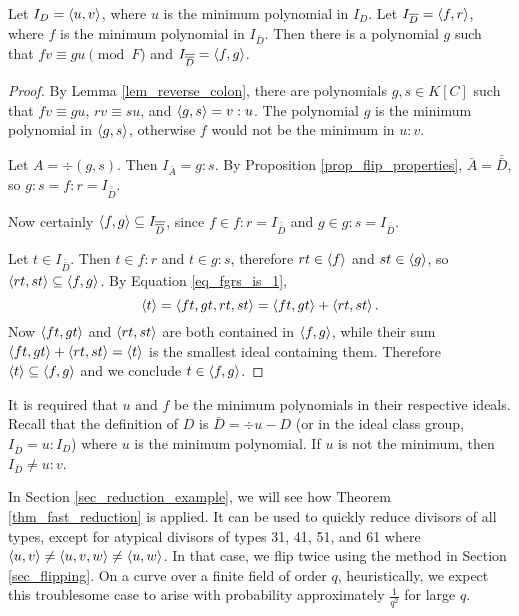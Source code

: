 \begin{theorem}
  \label{thm_fast_reduction}
  Let $I_D = \left\langle u,v \right\rangle$, where $u$ is the minimum polynomial in $I_D$.
  Let $I_{\overline D} = \left\langle f, r \right\rangle$, where $f$ is the minimum polynomial in $I_{\bar D}$.
  Then there is a polynomial $g$ such that $fv \equiv gu \pmod F$ and $I_{\overline{\overline D}} = \left\langle f,g \right\rangle$.
\end{theorem}
\begin{proof}
  By Lemma \ref{lem_reverse_colon},
  there are polynomials $g, s \in K[C]$ such that $fv \equiv gu$, $rv \equiv su$, and $\left\langle g,s \right\rangle = v : u$.
  The polynomial $g$ is the minimum polynomial in $\left\langle g,s \right\rangle$,
  otherwise $f$ would not be the minimum in $u : v$.
  
  Let $A = \div(g,s)$.
  Then $I_{\bar A} = g : s$.
  By Proposition \ref{prop_flip_properties}, $\bar A = \bar{\bar D}$,
  so $g : s = f : r = I_{\bar{\bar D}}$.
  
  Now certainly $\left\langle f,g \right\rangle \subseteq I_{\overline{\overline D}}$,
  since $f \in f : r = I_{\bar{\bar D}}$ and $g \in g : s = I_{\bar{\bar D}}$.
  
  Let $t \in I_{\bar{\bar D}}$.
  Then $t \in f : r$ and $t \in g : s$, therefore $rt \in \left\langle f \right\rangle$ and $st \in \left\langle g \right\rangle$,
  so $\left\langle rt, st \right\rangle \subseteq \left\langle f,g \right\rangle$.
  By Equation \ref{eq_fgrs_is_1},
  \[ \left\langle t \right\rangle = \left\langle ft,gt,rt,st \right\rangle = \left\langle ft,gt \right\rangle + \left\langle rt,st \right\rangle. \]
  Now $\left\langle ft,gt \right\rangle$ and $\left\langle rt,st \right\rangle$ are both contained in $\left\langle f, g \right\rangle$,
  while their sum $\left\langle ft,gt \right\rangle + \left\langle rt,st \right\rangle = \left\langle t \right\rangle$ is the smallest ideal containing them.
  Therefore $\left\langle t \right\rangle \subseteq \left\langle f,g \right\rangle$ and we conclude $t \in \left\langle f,g \right\rangle$.
\end{proof}
\begin{remark}
  It is required that $u$ and $f$ be the minimum polynomials in their respective ideals.
  Recall that the definition of $D$ is $\bar D = \div u - D$
  (or in the ideal class group, $I_{\bar D} = u : I_D$)
  where $u$ is the minimum polynomial.
  If $u$ is not the minimum, then $I_{\bar D} \neq u : v$.
\end{remark}

In Section \ref{sec_reduction_example}, we will see how Theorem \ref{thm_fast_reduction} is applied.
It can be used to quickly reduce divisors of all types, except for atypical divisors of types 31, 41, 51, and 61
where $\left\langle u,v \right\rangle \neq \left\langle u,v,w \right\rangle \neq \left\langle u,w \right\rangle$.
In that case, we flip twice using the method in Section \ref{sec_flipping}.
On a curve over a finite field of order $q$, heuristically,
we expect this troublesome case to arise with probability approximately $\frac 1 {q^2}$ for large $q$.



